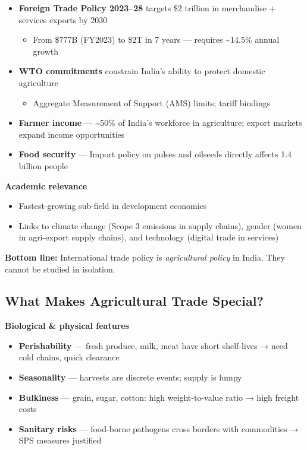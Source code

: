 \documentclass[
  letterpaper,
  DIV=11,
  numbers=noendperiod]{scrartcl}
\providecommand{\tightlist}{%
  \setlength{\itemsep}{0pt}\setlength{\parskip}{0pt}}
\begin{document}
\begin{itemize}
\tightlist
\item
  \textbf{Foreign Trade Policy 2023--28} targets \$2 trillion in
  merchandise + services exports by 2030

  \begin{itemize}
  \tightlist
  \item
    From \$777B (FY2023) to \$2T in 7 years --- requires
    \textasciitilde14.5\% annual growth
  \end{itemize}
\item
  \textbf{WTO commitments} constrain India's ability to protect domestic
  agriculture

  \begin{itemize}
  \tightlist
  \item
    Aggregate Measurement of Support (AMS) limits; tariff bindings
  \end{itemize}
\item
  \textbf{Farmer income} --- \textasciitilde50\% of India's workforce in
  agriculture; export markets expand income opportunities
\item
  \textbf{Food security} --- Import policy on pulses and oilseeds
  directly affects 1.4 billion people
\end{itemize}

\textbf{Academic relevance}

\begin{itemize}
\tightlist
\item
  Fastest-growing sub-field in development economics
\item
  Links to climate change (Scope 3 emissions in supply chains), gender
  (women in agri-export supply chains), and technology (digital trade in
  services)
\end{itemize}

\textbf{Bottom line:} International trade policy is \emph{agricultural
policy} in India. They cannot be studied in isolation.

\subsection{What Makes Agricultural Trade
Special?}\label{what-makes-agricultural-trade-special}

\textbf{Biological \& physical features}

\begin{itemize}
\tightlist
\item
  \textbf{Perishability} --- fresh produce, milk, meat have short
  shelf-lives → need cold chains, quick clearance
\item
  \textbf{Seasonality} --- harvests are discrete events; supply is lumpy
\item
  \textbf{Bulkiness} --- grain, sugar, cotton: high weight-to-value
  ratio → high freight costs
\item
  \textbf{Sanitary risks} --- food-borne pathogens cross borders with
  commodities → SPS measures justified
\end{itemize}
\end{document}
